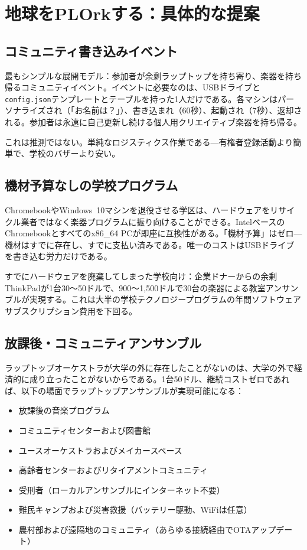\documentclass[10pt,letterpaper,twocolumn]{article}
\begin{document}
\section{地球をPLOrkする：具体的な提案}
\label{sec:proposal}

\subsection{コミュニティ書き込みイベント}

最もシンプルな展開モデル：参加者が余剰ラップトップを持ち寄り、楽器を持ち帰るコミュニティイベント。イベントに必要なのは、USBドライブと\texttt{config.json}テンプレートとテーブルを持った1人だけである。各マシンはパーソナライズされ（「お名前は？」）、書き込まれ（60秒）、起動され（7秒）、返却される。参加者は永遠に自己更新し続ける個人用クリエイティブ楽器を持ち帰る。

これは推測ではない。単純なロジスティクス作業である---有権者登録活動より簡単で、学校のバザーより安い。

\subsection{機材予算なしの学校プログラム}

ChromebookやWindows~10マシンを退役させる学区は、ハードウェアをリサイクル業者ではなく楽器プログラムに振り向けることができる。IntelベースのChromebookとすべてのx86\_64 PCが即座に互換性がある。「機材予算」はゼロ---機材はすでに存在し、すでに支払い済みである。唯一のコストはUSBドライブを書き込む労力だけである。

すでにハードウェアを廃棄してしまった学校向け：企業ドナーからの余剰ThinkPadが1台30〜50ドルで、900〜1,500ドルで30台の楽器による教室アンサンブルが実現する。これは大半の学校テクノロジープログラムの年間ソフトウェアサブスクリプション費用を下回る。

\subsection{放課後・コミュニティアンサンブル}

ラップトップオーケストラが大学の外に存在したことがないのは、大学の外で経済的に成り立ったことがないからである。1台50ドル、継続コストゼロであれば、以下の場面でラップトップアンサンブルが実現可能になる：

\begin{itemize}
  \item 放課後の音楽プログラム
  \item コミュニティセンターおよび図書館
  \item ユースオーケストラおよびメイカースペース
  \item 高齢者センターおよびリタイアメントコミュニティ
  \item 受刑者（ローカルアンサンブルにインターネット不要）
  \item 難民キャンプおよび災害救援（バッテリー駆動、WiFiは任意）
  \item 農村部および遠隔地のコミュニティ（あらゆる接続経由でOTAアップデート）
\end{itemize}
\end{document}
